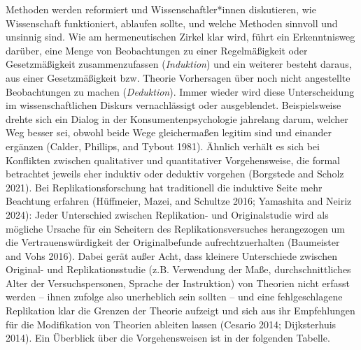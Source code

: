 \documentclass[
  letterpaper,
  DIV=11,
  numbers=noendperiod]{scrreprt}
\begin{document}
Methoden werden reformiert und Wissenschaftler*innen diskutieren, wie
Wissenschaft funktioniert, ablaufen sollte, und welche Methoden sinnvoll
und unsinnig sind. Wie am hermeneutischen Zirkel klar wird, führt ein
Erkenntnisweg darüber, eine Menge von Beobachtungen zu einer
Regelmäßigkeit oder Gesetzmäßigkeit zusammenzufassen (\emph{Induktion})
und ein weiterer besteht daraus, aus einer Gesetzmäßigkeit bzw. Theorie
Vorhersagen über noch nicht angestellte Beobachtungen zu machen
(\emph{Deduktion}). Immer wieder wird diese Unterscheidung im
wissenschaftlichen Diskurs vernachlässigt oder ausgeblendet.
Beispielsweise drehte sich ein Dialog in der Konsumentenpsychologie
jahrelang darum, welcher Weg besser sei, obwohl beide Wege gleichermaßen
legitim sind und einander ergänzen (Calder, Phillips, and Tybout 1981).
Ähnlich verhält es sich bei Konflikten zwischen qualitativer und
quantitativer Vorgehensweise, die formal betrachtet jeweils eher
induktiv oder deduktiv vorgehen (Borgstede and Scholz 2021). Bei
Replikationsforschung hat traditionell die induktive Seite mehr
Beachtung erfahren (Hüffmeier, Mazei, and Schultze 2016; Yamashita and
Neiriz 2024): Jeder Unterschied zwischen Replikation- und Originalstudie
wird als mögliche Ursache für ein Scheitern des Replikationsversuches
herangezogen um die Vertrauenswürdigkeit der Originalbefunde
aufrechtzuerhalten (Baumeister and Vohs 2016). Dabei gerät außer Acht,
dass kleinere Unterschiede zwischen Original- und Replikationsstudie
(z.B. Verwendung der Maße, durchschnittliches Alter der
Versuchspersonen, Sprache der Instruktion) von Theorien nicht erfasst
werden -- ihnen zufolge also unerheblich sein sollten -- und eine
fehlgeschlagene Replikation klar die Grenzen der Theorie aufzeigt und
sich aus ihr Empfehlungen für die Modifikation von Theorien ableiten
lassen (Cesario 2014; Dijksterhuis 2014). Ein Überblick über die
Vorgehensweisen ist in der folgenden Tabelle.
\end{document}
